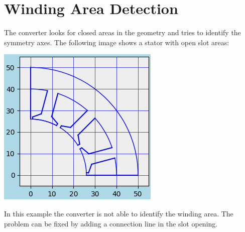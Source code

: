 \documentclass[10pt, a4paper,german]{scrartcl}
\newcommand{\Slanted}[1]{{\normalfont\slshape #1}}
\newcommand{\LongArg}[1]{\mbox{{-}{-}#1}}
\begin{document}
\begin{itemize}


\end{itemize}

\section{Winding Area Detection}
The converter looks for closed areas in the geometry and tries to identify
the symmetry axes. The following image shows a stator with open slot areas:
\begin{center}
\includegraphics[width=0.45\linewidth]{BspStator}
\end{center}
In this example the converter is not able to identify the winding area.
The problem can be fixed by adding a connection line in the slot opening.
\end{document}
